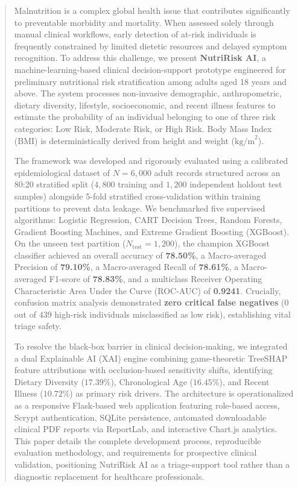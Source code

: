 \documentclass[conference]{IEEEtran}
\begin{document}
\begin{abstract}
Malnutrition is a complex global health issue that contributes significantly to preventable morbidity and mortality. When assessed solely through manual clinical workflows, early detection of at-risk individuals is frequently constrained by limited dietetic resources and delayed symptom recognition. To address this challenge, we present \textbf{NutriRisk AI}, a machine-learning-based clinical decision-support prototype engineered for preliminary nutritional risk stratification among adults aged 18 years and above. The system processes non-invasive demographic, anthropometric, dietary diversity, lifestyle, socioeconomic, and recent illness features to estimate the probability of an individual belonging to one of three risk categories: Low Risk, Moderate Risk, or High Risk. Body Mass Index (BMI) is deterministically derived from height and weight ($\text{kg/m}^2$). 

The framework was developed and rigorously evaluated using a calibrated epidemiological dataset of $N = 6{,}000$ adult records structured across an 80:20 stratified split ($4{,}800$ training and $1{,}200$ independent holdout test samples) alongside 5-fold stratified cross-validation within training partitions to prevent data leakage. We benchmarked five supervised algorithms: Logistic Regression, CART Decision Trees, Random Forests, Gradient Boosting Machines, and Extreme Gradient Boosting (XGBoost). On the unseen test partition ($N_{\text{test}} = 1{,}200$), the champion XGBoost classifier achieved an overall accuracy of \textbf{78.50\%}, a Macro-averaged Precision of \textbf{79.10\%}, a Macro-averaged Recall of \textbf{78.61\%}, a Macro-averaged F1-score of \textbf{78.83\%}, and a multiclass Receiver Operating Characteristic Area Under the Curve (ROC-AUC) of \textbf{0.9241}. Crucially, confusion matrix analysis demonstrated \textbf{zero critical false negatives} ($0$ out of $439$ high-risk individuals misclassified as low risk), establishing vital triage safety.

To resolve the black-box barrier in clinical decision-making, we integrated a dual Explainable AI (XAI) engine combining game-theoretic TreeSHAP feature attributions with occlusion-based sensitivity shifts, identifying Dietary Diversity ($17.39\%$), Chronological Age ($16.45\%$), and Recent Illness ($10.72\%$) as primary risk drivers. The architecture is operationalized as a responsive Flask-based web application featuring role-based access, Scrypt authentication, SQLite persistence, automated downloadable clinical PDF reports via ReportLab, and interactive Chart.js analytics. This paper details the complete development process, reproducible evaluation methodology, and requirements for prospective clinical validation, positioning NutriRisk AI as a triage-support tool rather than a diagnostic replacement for healthcare professionals.
\end{abstract}
\end{document}
